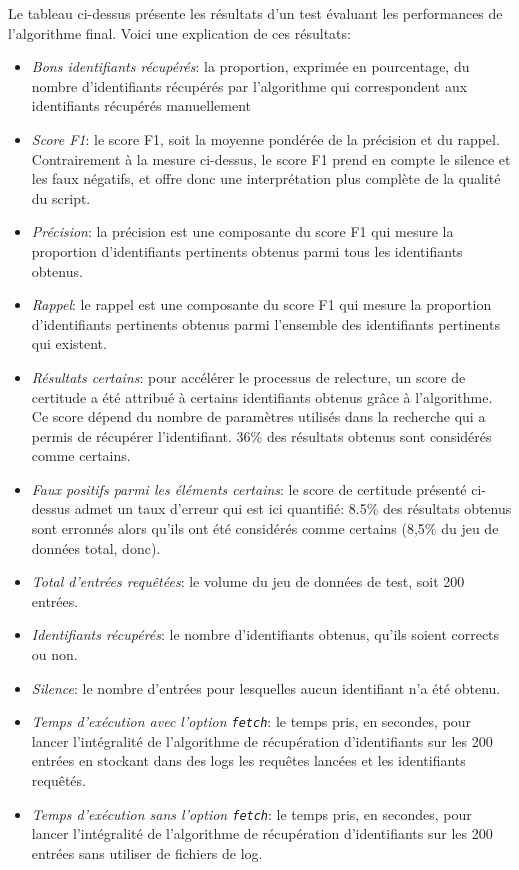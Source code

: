 Le tableau ci-dessus présente les résultats d'un test évaluant les performances de l'algorithme final. Voici une explication de ces résultats:
\begin{itemize}
	\item \textit{Bons identifiants récupérés}: la proportion, exprimée en pourcentage, du nombre d'identifiants récupérés par l'algorithme qui correspondent aux identifiants récupérés manuellement
	\item \textit{Score F1}: le \gls{score F1}, soit la moyenne pondérée de la précision et du rappel. Contrairement  à la mesure ci-dessus, le score F1 prend en compte le silence et les faux négatifs, et offre donc une interprétation plus complète de la qualité du script.
	\item \textit{Précision}: la précision est une composante du \gls{score F1} qui mesure la proportion d'identifiants pertinents obtenus parmi tous les identifiants obtenus.
	\item \textit{Rappel}: le rappel est une composante du \gls{score F1} qui mesure la proportion d'identifiants pertinents obtenus parmi l'ensemble des identifiants pertinents qui existent.
	\item \textit{Résultats certains}: pour accélérer le processus de relecture, un score de certitude a été attribué à certains identifiants obtenus grâce à l'algorithme. Ce score dépend du nombre de paramètres utilisés dans la recherche qui a permis de récupérer l'identifiant. 36\% des résultats obtenus sont considérés comme certains.
	\item \textit{Faux positifs parmi les éléments certains}: le score de certitude présenté ci-dessus admet un taux d'erreur qui est ici quantifié: 8.5\% des résultats obtenus sont erronnés alors qu'ils ont été considérés comme certains (8,5\% du jeu de données total, donc).
	\item \textit{Total d'entrées requêtées}: le volume du jeu de données de test, soit 200 entrées.
	\item \textit{Identifiants récupérés}: le nombre d'identifiants obtenus, qu'ils soient corrects ou non.
	\item \textit{Silence}: le nombre d'entrées pour lesquelles aucun identifiant n'a été obtenu.
	\item \textit{Temps d'exécution avec l'option \texttt{fetch}}: le temps pris, en secondes, pour lancer l'intégralité de l'algorithme de récupération d'identifiants \wkd{} sur les 200 entrées en stockant dans des \glspl{log} les requêtes lancées et les identifiants requêtés.
	\item \textit{Temps d'exécution sans l'option \texttt{fetch}}: le temps pris, en secondes, pour lancer l'intégralité de l'algorithme de récupération d'identifiants sur les 200 entrées sans utiliser de fichiers de log.
\end{itemize}
\clearpage

